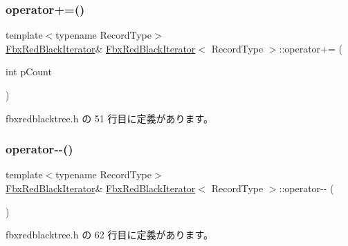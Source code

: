 \mbox{\label{class_fbx_red_black_iterator_aced77a1a0958e3f5d0b8f1a9cc47b42d}} 
\subsubsection{\texorpdfstring{operator+=()}{operator+=()}}
{\footnotesize\ttfamily template$<$typename Record\+Type$>$ \\
\hyperlink{class_fbx_red_black_iterator}{Fbx\+Red\+Black\+Iterator}\& \hyperlink{class_fbx_red_black_iterator}{Fbx\+Red\+Black\+Iterator}$<$ Record\+Type $>$\+::operator+= (\begin{DoxyParamCaption}\item[{int}]{p\+Count }\end{DoxyParamCaption})\hspace{0.3cm}{\ttfamily [inline]}}



 fbxredblacktree.\+h の 51 行目に定義があります。

\mbox{\label{class_fbx_red_black_iterator_a586034c7ed6bf9ecdda3e21861d51a11}} 
\subsubsection{\texorpdfstring{operator-\/-\/()}{operator--()}\hspace{0.1cm}{\footnotesize\ttfamily [1/2]}}
{\footnotesize\ttfamily template$<$typename Record\+Type$>$ \\
\hyperlink{class_fbx_red_black_iterator}{Fbx\+Red\+Black\+Iterator}\& \hyperlink{class_fbx_red_black_iterator}{Fbx\+Red\+Black\+Iterator}$<$ Record\+Type $>$\+::operator-\/-\/ (\begin{DoxyParamCaption}{ }\end{DoxyParamCaption})\hspace{0.3cm}{\ttfamily [inline]}}



 fbxredblacktree.\+h の 62 行目に定義があります。

\mbox{\label{class_fbx_red_black_iterator_a29bd733723bc879fb8057d7ae55279b4}} 
